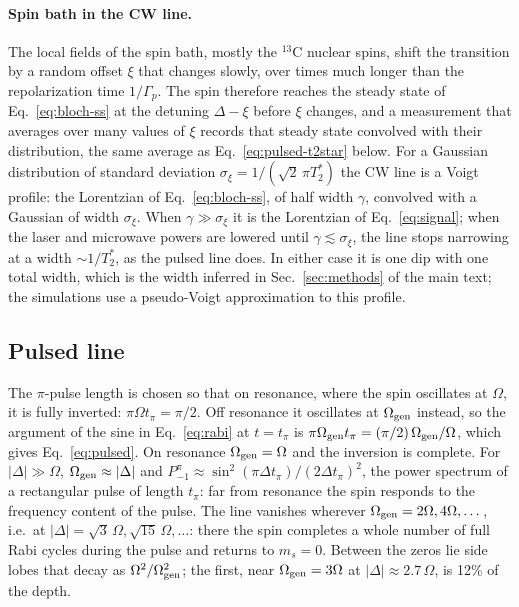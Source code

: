 \paragraph{Spin bath in the CW line.} The local fields of the spin bath, mostly the $^{13}$C nuclear spins, shift
the transition by a random offset $\xi$ that changes slowly, over times much longer than the repolarization time
$1/\Gamma_p$. The spin therefore reaches the steady state of Eq.~\eqref{eq:bloch-ss} at the detuning $\Delta-\xi$
before $\xi$ changes, and a measurement that averages over many values of $\xi$ records that steady state convolved
with their distribution, the same average as Eq.~\eqref{eq:pulsed-t2star} below. For a Gaussian distribution of
standard deviation $\sigma_\xi=1/(\sqrt2\,\pi T_2^*)$ the CW line is a Voigt profile: the Lorentzian of
Eq.~\eqref{eq:bloch-ss}, of half width $\gamma$, convolved with a Gaussian of width $\sigma_\xi$. When
$\gamma\gg\sigma_\xi$ it is the Lorentzian of Eq.~\eqref{eq:signal}; when the laser and microwave powers are
lowered until $\gamma\lesssim\sigma_\xi$, the line stops narrowing at a width $\sim1/T_2^*$, as the pulsed line does.
In either case it is one dip with one total width, which is the width inferred in Sec.~\ref{sec:methods} of the main
text; the simulations use a pseudo-Voigt approximation to this profile.

\subsection{Pulsed line}
\label{sm:pulsed}

The $\pi$-pulse length is chosen so that on resonance, where the spin oscillates at
$\Omega$, it is fully inverted: $\pi\Omega t_\pi=\pi/2$. Off resonance it oscillates at $\Omega_{\rm gen}$ instead, so
the argument of the sine in Eq.~\eqref{eq:rabi} at $t=t_\pi$ is $\pi\Omega_{\rm gen} t_\pi=(\pi/2)\,\Omega_{\rm gen}/\Omega$,
which gives Eq.~\eqref{eq:pulsed}. On resonance $\Omega_{\rm gen}=\Omega$ and the inversion is complete. For
$|\Delta|\gg\Omega$, $\Omega_{\rm gen}\approx|\Delta|$ and
$P_{-1}^{\pi}\approx\sin^2(\pi\Delta t_\pi)/(2\Delta t_\pi)^2$, the power spectrum of a rectangular pulse of length
$t_\pi$: far from resonance the spin responds to the frequency content of the pulse. The line vanishes wherever
$\Omega_{\rm gen}=2\Omega,4\Omega,\dots$, i.e.\ at $|\Delta|=\sqrt3\,\Omega,\sqrt{15}\,\Omega,\dots$: there the spin
completes a whole number of full Rabi cycles during the pulse and returns to $m_s=0$. Between the zeros lie side
lobes that decay as $\Omega^2/\Omega_{\rm gen}^2$; the first, near $\Omega_{\rm gen}=3\Omega$ at $|\Delta|\approx2.7\,\Omega$,
is 12\% of the depth.

